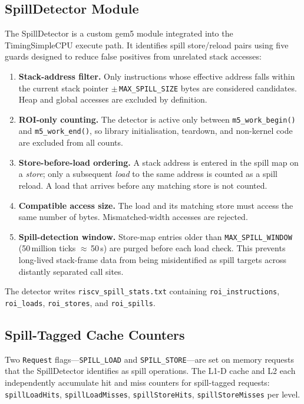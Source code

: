 \documentclass[conference]{IEEEtran}
\begin{document}
\subsection{SpillDetector Module}

The SpillDetector is a custom gem5 module integrated into the
TimingSimpleCPU execute path.  It identifies spill store/reload pairs
using five guards designed to reduce false positives from unrelated
stack accesses:

\begin{enumerate}
  \item \textbf{Stack-address filter.}  Only instructions whose
    effective address falls within the current stack pointer
    $\pm$\,\texttt{MAX\_SPILL\_SIZE} bytes are considered candidates.
    Heap and global accesses are excluded by definition.
  \item \textbf{ROI-only counting.}  The detector is active only
    between \texttt{m5\_work\_begin()} and \texttt{m5\_work\_end()},
    so library initialisation, teardown, and non-kernel code are
    excluded from all counts.
  \item \textbf{Store-before-load ordering.}  A stack address is
    entered in the spill map on a \emph{store}; only a subsequent
    \emph{load} to the same address is counted as a spill reload.
    A load that arrives before any matching store is not counted.
  \item \textbf{Compatible access size.}  The load and its matching
    store must access the same number of bytes.  Mismatched-width
    accesses are rejected.
  \item \textbf{Spill-detection window.}  Store-map entries older
    than \texttt{MAX\_SPILL\_WINDOW} (50\,million ticks
    $\approx$\,50\,\textmu s) are purged before each load check.
    This prevents long-lived stack-frame data from being
    misidentified as spill targets across distantly separated
    call sites.
\end{enumerate}

The detector writes \texttt{riscv\_spill\_stats.txt} containing
\texttt{roi\_instructions}, \texttt{roi\_loads}, \texttt{roi\_stores},
and \texttt{roi\_spills}.

\subsection{Spill-Tagged Cache Counters}

Two \texttt{Request} flags---\texttt{SPILL\_LOAD} and
\texttt{SPILL\_STORE}---are set on memory requests that the
SpillDetector identifies as spill operations.
The L1-D cache and L2 each independently accumulate hit and miss
counters for spill-tagged requests:
\texttt{spillLoadHits}, \texttt{spillLoadMisses},
\texttt{spillStoreHits}, \texttt{spillStoreMisses} per level.
\end{document}
